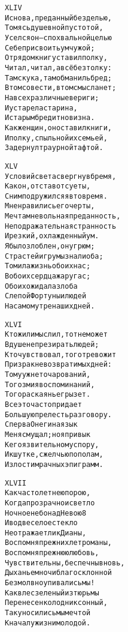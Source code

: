 \begin{minipage}[t]{\dimexpr 0.5\textwidth -\tabcolsep-.5pt}
\begin{alltt}\normalfont\centering
XLIV
И снова, преданный безделью,
Томясь душевной пустотой,
Уселся он — с похвальной целью
Себе присвоить ум чужой;
Отрядом книг уставил полку,
Читал, читал, а всё без толку:
Там скука, там обман иль бред;
В том совести, в том смысла нет;
На всех различные вериги;
И устарела старина,
И старым бредит новизна.
Как женщин, он оставил книги,
И полку, с пыльной их семьей,
Задернул траурной тафтой.
\end{alltt}
\end{minipage}
\clearpage

\begin{minipage}[t]{\dimexpr 0.5\textwidth -\tabcolsep-.5pt}
\begin{alltt}\normalfont\centering
XLV
Условий света свергнув бремя,
Как он, отстав от суеты,
С ним подружился я в то время.
Мне нравились его черты,
Мечтам невольная преданность,
Неподражательная странность
И резкий, охлажденный ум.
Я был озлоблен, он угрюм;
Страстей игру мы знали оба;
Томила жизнь обоих нас;
В обоих сердца жар угас;
Обоих ожидала злоба
Слепой Фортуны и людей
На самом утре наших дней.
\end{alltt}
\end{minipage}

\begin{minipage}[t]{\dimexpr 0.5\textwidth -\tabcolsep-.5pt}
\begin{alltt}\normalfont\centering
XLVI
Кто жил и мыслил, тот не может
В душе не презирать людей;
Кто чувствовал, того тревожит
Призрак невозвратимых дней:
Тому уж нет очарований,
Того змия воспоминаний,
Того раскаянье грызет.
Все это часто придает
Большую прелесть разговору.
Сперва Онегина язык
Меня смущал; но я привык
К его язвительному спору,
И к шутке, с желчью пополам,
И злости мрачных эпиграмм.
\end{alltt}
\end{minipage}
\clearpage

\begin{minipage}[t]{\dimexpr 0.5\textwidth -\tabcolsep-.5pt}
\begin{alltt}\normalfont\centering
XLVII
Как часто летнею порою,
Когда прозрачно и светло
Ночное небо над Невою 8
И вод веселое стекло
Не отражает лик Дианы,
Воспомня прежних лет романы,
Воспомня прежнюю любовь,
Чувствительны, беспечны вновь,
Дыханьем ночи благосклонной
Безмолвно упивались мы!
Как в лес зеленый из тюрьмы
Перенесен колодник сонный,
Так уносились мы мечтой
К началу жизни молодой.
\end{alltt}
\end{minipage}

